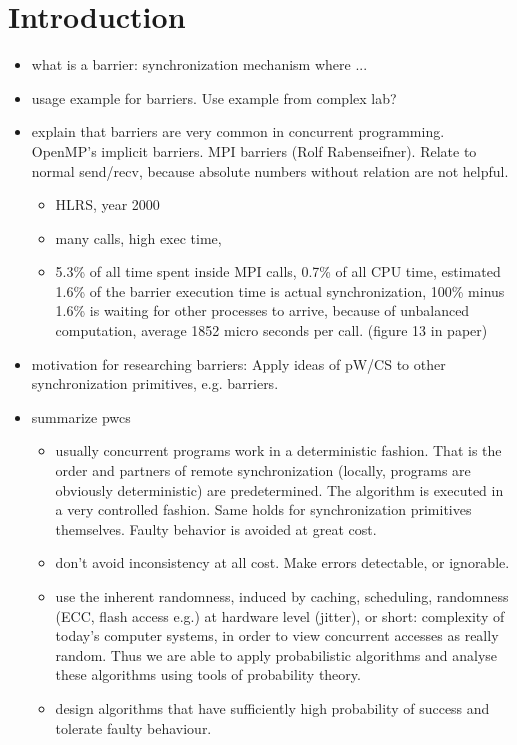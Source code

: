 \documentclass[a4paper, 10pt]{article}
\begin{document}
\section{Introduction}
\begin{itemize}
	\item what is a barrier: synchronization mechanism where ...
	\item usage example for barriers. Use example from complex lab?
	\item explain that barriers are very common in concurrent programming. OpenMP's\cite{openmp} implicit barriers. MPI barriers (Rolf Rabenseifner\cite{rab00}). Relate to normal send/recv, because absolute numbers without relation are not helpful.
		\begin{itemize}
			\item HLRS, year 2000
			\item many calls, high exec time,
			\item 5.3\% of all time spent inside MPI calls, 0.7\% of all CPU time, estimated 1.6\% of the barrier execution time is actual synchronization, 100\% minus 1.6\% is waiting for other processes to arrive, because of unbalanced computation, average 1852 micro seconds per call. (figure 13 in paper)
		\end{itemize}
	\item motivation for researching barriers: Apply ideas of pW/CS\cite{pwcs} to other synchronization primitives, e.g. barriers.
	\item summarize pwcs
		\begin{itemize}
			\item usually concurrent programs work in a deterministic fashion. That is the order and partners of remote synchronization (locally, programs are obviously deterministic) are predetermined. The algorithm is executed in a very controlled fashion. Same holds for synchronization primitives themselves. Faulty behavior is avoided at great cost.
			\item don't avoid inconsistency at all cost. Make errors detectable, or ignorable.
			\item use the inherent randomness\cite{mcg09}, induced by caching, scheduling, randomness (ECC, flash access e.g.) at hardware level (jitter), or short: complexity of today's computer systems, in order to view concurrent accesses as really random. Thus we are able to apply probabilistic algorithms and analyse these algorithms using tools of probability theory.
			\item design algorithms that have sufficiently high probability of success and tolerate faulty behaviour.

\end{itemize}
\end{itemize}
\end{document}
